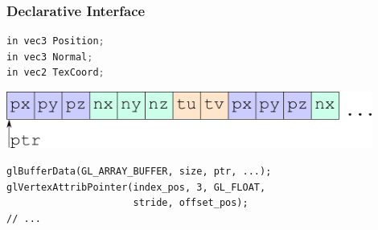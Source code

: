 \documentclass[aspectratio=169]{beamer}
\begin{document}
\begin{frame}[fragile]
  \frametitle{Declarative Interface}
  
  \begin{lstlisting}[language={C}]
in vec3 Position;
in vec3 Normal;
in vec2 TexCoord;
  \end{lstlisting}
  
  \includegraphics[width=0.9\textwidth]{ifgfx/vertex_buffer_0.png}
  
  \begin{lstlisting}[style=cpp20]
glBufferData(GL_ARRAY_BUFFER, size, ptr, ...);
glVertexAttribPointer(index_pos, 3, GL_FLOAT,
                      stride, offset_pos);
// ...
  \end{lstlisting}
  
\end{frame}

\end{document}
